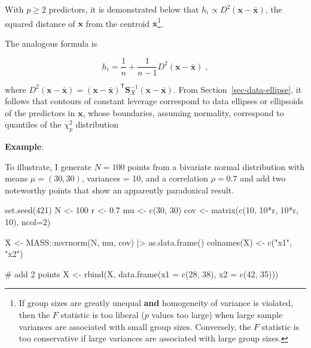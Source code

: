 \documentclass[
  letterpaper,
  10pt,
  krantz2]{krantz}
\makeatletter
\newenvironment{Shaded}{\begin{snugshade}}{\end{snugshade}}
\newcommand{\AttributeTok}[1]{\textcolor[rgb]{0.40,0.45,0.13}{#1}}
\newcommand{\CommentTok}[1]{\textcolor[rgb]{0.37,0.37,0.37}{#1}}
\newcommand{\DecValTok}[1]{\textcolor[rgb]{0.68,0.00,0.00}{#1}}
\newcommand{\FloatTok}[1]{\textcolor[rgb]{0.68,0.00,0.00}{#1}}
\newcommand{\FunctionTok}[1]{\textcolor[rgb]{0.28,0.35,0.67}{#1}}
\newcommand{\NormalTok}[1]{\textcolor[rgb]{0.00,0.23,0.31}{#1}}
\newcommand{\OtherTok}[1]{\textcolor[rgb]{0.00,0.23,0.31}{#1}}
\newcommand{\SpecialCharTok}[1]{\textcolor[rgb]{0.37,0.37,0.37}{#1}}
\newcommand{\StringTok}[1]{\textcolor[rgb]{0.13,0.47,0.30}{#1}}
\newenvironment{kframe}{%
  \medskip{}
  \setlength{\fboxsep}{.8em}
  \def\at@end@of@kframe{}%
  \ifinner\ifhmode%
  \def\at@end@of@kframe{\end{minipage}}%
  \begin{minipage}{\columnwidth}%
  \fi\fi%
  \def\FrameCommand##1{\hskip\@totalleftmargin \hskip-\fboxsep
  \colorbox{shadecolor}{##1}\hskip-\fboxsep
      \hskip-\linewidth \hskip-\@totalleftmargin \hskip\columnwidth}%
  \MakeFramed {\advance\hsize-\width
    \@totalleftmargin\z@ \linewidth\hsize
    \@setminipage}}%
{\par\unskip\endMakeFramed%
  \at@end@of@kframe}
\renewenvironment{Shaded}{\begin{kframe}}{\end{kframe}}
\makeatother
\begin{document}
With \(p \ge 2\) predictors, it is demonstrated below that
\(h_i \propto D^2 (\mathbf{x} - \bar{\mathbf{x}})\), the squared
distance of \(\mathbf{x}\) from the centroid
\(\bar{\mathbf{x}}\)\footnote{If group sizes are greatly unequal
  \textbf{and} homogeneity of variance is violated, then the \(F\)
  statistic is too liberal (\(p\) values too large) when large sample
  variances are associated with small group sizes. Conversely, the \(F\)
  statistic is too conservative if large variances are associated with
  large group sizes.}.

The analogous formula is

\[
h_i = \frac{1}{n} + \frac{1}{n-1} D^2 (\mathbf{x} - \bar{\mathbf{x}}) \; ,
\]

where
\(D^2 (\mathbf{x} - \bar{\mathbf{x}}) = (\mathbf{x} - \bar{\mathbf{x}})^\mathsf{T} \mathbf{S}_X^{-1} (\mathbf{x} - \bar{\mathbf{x}})\).
From Section~\ref{sec-data-ellipse}, it follows that contours of
constant leverage correspond to data ellipses or ellipsoids of the
predictors in \(\mathbf{x}\), whose boundaries, assuming normality,
correspond to quantiles of the \(\chi^2_p\) distribution

\textbf{Example}:

To illustrate, I generate \(N = 100\) points from a bivariate normal
distribution with means \(\mu = (30, 30)\), variances = 10, and a
correlation \(\rho = 0.7\) and add two noteworthy points that show an
apparently paradoxical result.

\begin{Shaded}
\begin{Highlighting}[]
\FunctionTok{set.seed}\NormalTok{(}\DecValTok{421}\NormalTok{)}
\NormalTok{N }\OtherTok{\textless{}{-}} \DecValTok{100}
\NormalTok{r }\OtherTok{\textless{}{-}} \FloatTok{0.7}
\NormalTok{mu }\OtherTok{\textless{}{-}} \FunctionTok{c}\NormalTok{(}\DecValTok{30}\NormalTok{, }\DecValTok{30}\NormalTok{)}
\NormalTok{cov }\OtherTok{\textless{}{-}} \FunctionTok{matrix}\NormalTok{(}\FunctionTok{c}\NormalTok{(}\DecValTok{10}\NormalTok{,   }\DecValTok{10}\SpecialCharTok{*}\NormalTok{r,}
                \DecValTok{10}\SpecialCharTok{*}\NormalTok{r, }\DecValTok{10}\NormalTok{), }\AttributeTok{ncol=}\DecValTok{2}\NormalTok{)}

\NormalTok{X }\OtherTok{\textless{}{-}}\NormalTok{ MASS}\SpecialCharTok{::}\FunctionTok{mvrnorm}\NormalTok{(N, mu, cov) }\SpecialCharTok{|\textgreater{}} \FunctionTok{as.data.frame}\NormalTok{()}
\FunctionTok{colnames}\NormalTok{(X) }\OtherTok{\textless{}{-}} \FunctionTok{c}\NormalTok{(}\StringTok{"x1"}\NormalTok{, }\StringTok{"x2"}\NormalTok{)}

\CommentTok{\# add 2 points}
\NormalTok{X }\OtherTok{\textless{}{-}} \FunctionTok{rbind}\NormalTok{(X,}
           \FunctionTok{data.frame}\NormalTok{(}\AttributeTok{x1 =} \FunctionTok{c}\NormalTok{(}\DecValTok{28}\NormalTok{, }\DecValTok{38}\NormalTok{),}
                      \AttributeTok{x2 =} \FunctionTok{c}\NormalTok{(}\DecValTok{42}\NormalTok{, }\DecValTok{35}\NormalTok{)))}
\end{Highlighting}
\end{Shaded}
\end{document}
